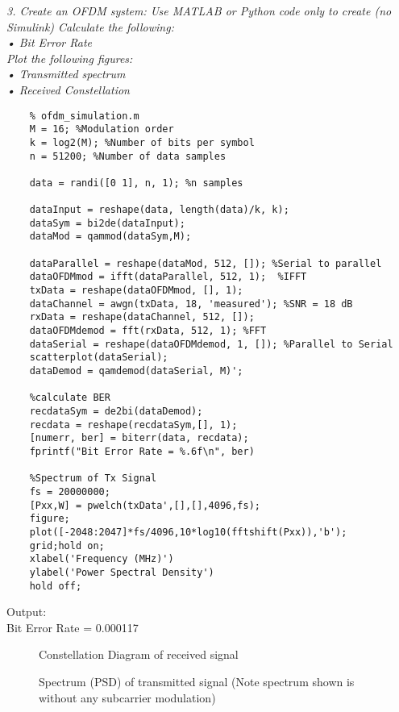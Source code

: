 \documentclass[a4paper]{article}
\begin{document}
	\textit{3. Create an OFDM system: Use MATLAB or Python code only to create (no Simulink) Calculate the following:\\
		• Bit Error Rate\\
		Plot the following figures:\\
		• Transmitted spectrum\\
		• Received Constellation\\
	}
	\smallskip
	\begin{verbatim}
	% ofdm_simulation.m
	M = 16; %Modulation order
	k = log2(M); %Number of bits per symbol
	n = 51200; %Number of data samples
	
	data = randi([0 1], n, 1); %n samples
	
	dataInput = reshape(data, length(data)/k, k);
	dataSym = bi2de(dataInput);
	dataMod = qammod(dataSym,M);
	
	dataParallel = reshape(dataMod, 512, []); %Serial to parallel
	dataOFDMmod = ifft(dataParallel, 512, 1);  %IFFT
	txData = reshape(dataOFDMmod, [], 1);
	dataChannel = awgn(txData, 18, 'measured'); %SNR = 18 dB
	rxData = reshape(dataChannel, 512, []);
	dataOFDMdemod = fft(rxData, 512, 1); %FFT
	dataSerial = reshape(dataOFDMdemod, 1, []); %Parallel to Serial
	scatterplot(dataSerial);
	dataDemod = qamdemod(dataSerial, M)';
	
	%calculate BER
	recdataSym = de2bi(dataDemod);
	recdata = reshape(recdataSym,[], 1);
	[numerr, ber] = biterr(data, recdata);
	fprintf("Bit Error Rate = %.6f\n", ber)
	
	%Spectrum of Tx Signal
	fs = 20000000;
	[Pxx,W] = pwelch(txData',[],[],4096,fs);    
	figure;
	plot([-2048:2047]*fs/4096,10*log10(fftshift(Pxx)),'b'); 
	grid;hold on;
	xlabel('Frequency (MHz)')
	ylabel('Power Spectral Density')
	hold off;
	\end{verbatim}
	Output:\\
	Bit Error Rate = 0.000117
	\begin{figure}[hbt!]
		\centering
		
		\caption{Constellation Diagram of received signal}
	\end{figure}
	\begin{figure}[hbt!]
		\centering
		
		\caption{Spectrum (PSD) of transmitted signal (Note spectrum shown is without any subcarrier modulation)}
	\end{figure}
\end{document}
